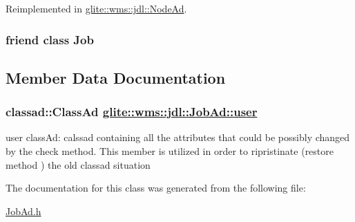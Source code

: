 Reimplemented in \hyperlink{classglite_1_1wms_1_1jdl_1_1NodeAd_n0}{glite::wms::jdl::Node\-Ad}.\hypertarget{classglite_1_1wms_1_1jdl_1_1JobAd_n0}{
\subsubsection[Job]{\setlength{\rightskip}{0pt plus 5cm}friend class Job}}
\label{classglite_1_1wms_1_1jdl_1_1JobAd_n0}




\subsection{Member Data Documentation}
\hypertarget{classglite_1_1wms_1_1jdl_1_1JobAd_p0}{
\subsubsection[user]{\setlength{\rightskip}{0pt plus 5cm}classad::Class\-Ad \hyperlink{classglite_1_1wms_1_1jdl_1_1JobAd_p0}{glite::wms::jdl::Job\-Ad::user}}}
\label{classglite_1_1wms_1_1jdl_1_1JobAd_p0}


user class\-Ad: calssad containing all the attributes that could be possibly changed by the check method. This member is utilized in order to ripristinate (restore method ) the old classad situation 

The documentation for this class was generated from the following file:\begin{CompactItemize}
\item 
\hyperlink{JobAd_8h}{Job\-Ad.h}\end{CompactItemize}
